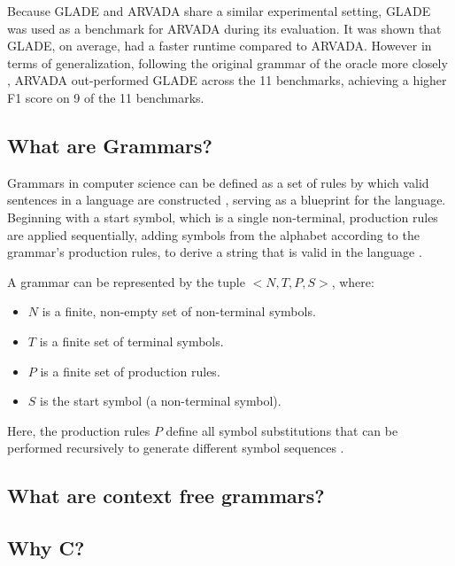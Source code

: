 \vspace{\baselineskip}

Because GLADE and ARVADA share a similar experimental setting, GLADE was used as a benchmark for ARVADA during its evaluation. It was shown that GLADE, on average, had a faster runtime compared to ARVADA. However in terms of generalization, following the original grammar of the oracle more closely , ARVADA out-performed GLADE across the 11 benchmarks, achieving a higher F1 score on 9 of the 11 benchmarks.

\subsection{What are Grammars?}

Grammars in computer science can be defined as a set of rules by which valid sentences in a language are constructed \cite{jiangFormalGrammarsLanguages}, serving as a blueprint for the language. Beginning with a start symbol, which is a single non-terminal, production rules are applied sequentially, adding symbols from the alphabet according to the grammar’s production rules, to derive a string that is valid in the language \cite{GrammarTheoryComputation2025}.

\vspace{\baselineskip}

A grammar can be represented by the tuple $<N, T, P, S>$, where:
\begin{itemize}
\item $N$ is a finite, non-empty set of non-terminal symbols.
\item $T$ is a finite set of terminal symbols.
\item $P$ is a finite set of production rules.
\item $S$ is the start symbol (a non-terminal symbol).
\end{itemize}

Here, the production rules $P$ define all symbol substitutions that can be performed recursively to generate different symbol sequences \cite{GrammarTheoryComputation2025}.

\subsection{What are context free grammars?}


\subsection{Why C?}

